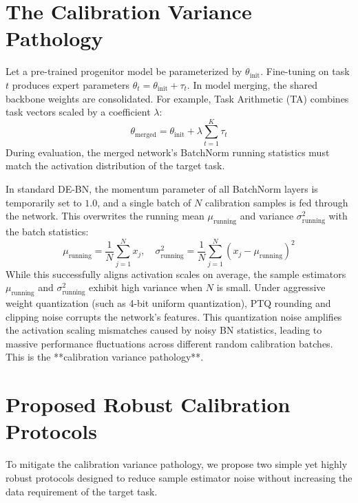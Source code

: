 \documentclass{article}
\begin{document}
\section{The Calibration Variance Pathology}
\label{submission-pathology}
Let a pre-trained progenitor model be parameterized by $\theta_{\text{init}}$. Fine-tuning on task $t$ produces expert parameters $\theta_t = \theta_{\text{init}} + \tau_t$. In model merging, the shared backbone weights are consolidated. For example, Task Arithmetic (TA) combines task vectors scaled by a coefficient $\lambda$:
\begin{equation}
    \theta_{\text{merged}} = \theta_{\text{init}} + \lambda \sum_{t=1}^K \tau_t
\end{equation}
During evaluation, the merged network's BatchNorm running statistics must match the activation distribution of the target task.

In standard DE-BN, the momentum parameter of all BatchNorm layers is temporarily set to $1.0$, and a single batch of $N$ calibration samples is fed through the network. This overwrites the running mean $\mu_{\text{running}}$ and variance $\sigma^2_{\text{running}}$ with the batch statistics:
\begin{equation}
    \mu_{\text{running}} = \frac{1}{N} \sum_{j=1}^N x_j, \quad \sigma^2_{\text{running}} = \frac{1}{N} \sum_{j=1}^N (x_j - \mu_{\text{running}})^2
\end{equation}
While this successfully aligns activation scales on average, the sample estimators $\mu_{\text{running}}$ and $\sigma^2_{\text{running}}$ exhibit high variance when $N$ is small. Under aggressive weight quantization (such as 4-bit uniform quantization), PTQ rounding and clipping noise corrupts the network's features. This quantization noise amplifies the activation scaling mismatches caused by noisy BN statistics, leading to massive performance fluctuations across different random calibration batches. This is the **calibration variance pathology**.

\section{Proposed Robust Calibration Protocols}
To mitigate the calibration variance pathology, we propose two simple yet highly robust protocols designed to reduce sample estimator noise without increasing the data requirement of the target task.
\end{document}
